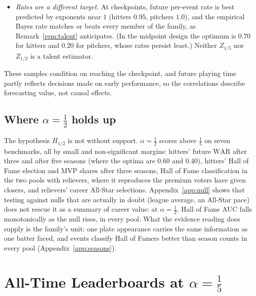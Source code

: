 \documentclass[11pt,letterpaper]{article}
\theoremstyle{plain}
\theoremstyle{definition}
\theoremstyle{remark}
\newcommand{\WAR}{\mathrm{WAR}}
\begin{document}
\begin{itemize}
    \item \emph{Rates are a different target.} At checkpoints, future per-event rate is best predicted by exponents near $1$ (hitters $0.95$, pitchers $1.0$), and the empirical Bayes rate matches or beats every member of the family, as Remark~\ref{rem:talent} anticipates. (In the midpoint design the optimum is $0.70$ for hitters and $0.20$ for pitchers, whose rates persist least.) Neither $Z_{1/5}$ nor $Z_{1/2}$ is a talent estimator.
\end{itemize}
These samples condition on reaching the checkpoint, and future playing time partly reflects decisions made on early performance, so the correlations describe forecasting value, not causal effects.

\subsection{Where \texorpdfstring{$\alpha = \tfrac12$}{alpha = 1/2} holds up}
\label{sec:half}

The hypothesis $H_{1/2}$ is not without support. $\alpha = \tfrac12$ scores above $\tfrac15$ on seven benchmarks, all by small and non-significant margins: hitters' future $\WAR$ after three and after five seasons (where the optima are $0.60$ and $0.40$), hitters' Hall of Fame election and MVP shares after three seasons, Hall of Fame classification in the two pools with relievers, where it reproduces the premium voters have given closers, and relievers' career All-Star selections. Appendix~\ref{app:null} shows that testing against nulls that are actually in doubt (league average, an All-Star pace) does not rescue it as a summary of career value: at $\alpha = \tfrac12$, Hall of Fame AUC falls monotonically as the null rises, in every pool. What the evidence reading does supply is the family's unit: one plate appearance carries the same information as one batter faced, and events classify Hall of Famers better than season counts in every pool (Appendix~\ref{app:seasons}).

\section{All-Time Leaderboards at \texorpdfstring{$\alpha = \tfrac15$}{alpha = 1/5}}
\label{sec:empirical}
\end{document}
